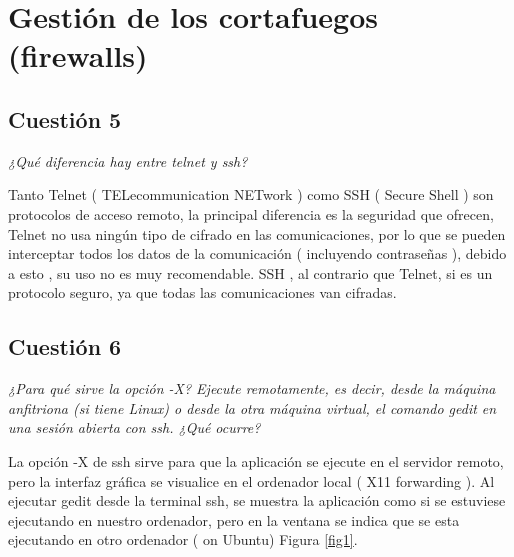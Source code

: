 \section{Gestión de los cortafuegos (firewalls)}
\subsection{Cuestión 5}
\textit{¿Qué diferencia hay entre telnet y ssh?}
\newline

Tanto Telnet ( TELecommunication NETwork ) como SSH ( Secure Shell ) son protocolos de acceso remoto, la principal diferencia es la seguridad que ofrecen, Telnet no usa ningún tipo de cifrado en las comunicaciones, por lo que se pueden interceptar todos los datos de la comunicación ( incluyendo contraseñas ), debido a esto , su uso no es muy recomendable. SSH , al contrario que Telnet, si es un protocolo seguro, ya que todas las comunicaciones van cifradas.  \cite{sshtle}





\subsection{Cuestión 6}
\textit{¿Para qué sirve la opción -X? Ejecute remotamente, es decir, desde la máquina anfitriona (si tiene Linux) o desde la otra máquina virtual, el comando gedit en una sesión abierta con ssh. ¿Qué ocurre?}
\newline

La opción -X de ssh sirve para que la aplicación se ejecute en el servidor remoto, pero la interfaz gráfica se visualice en el ordenador local ( X11 forwarding ). \cite{sshx} Al ejecutar gedit desde la terminal ssh, se muestra la aplicación como si se estuviese ejecutando en nuestro ordenador, pero en la ventana se indica que se esta ejecutando en otro ordenador ( on Ubuntu) Figura \ref{fig1}. 

